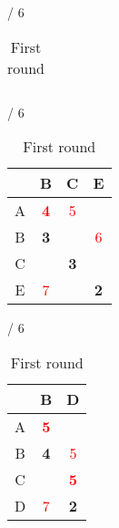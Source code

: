 \documentclass[a4paper, 11 pt, article, accentcolor=tud7b]{tudreport}
\begin{document}
\begin{table}[h]
\begin{subtable}[b]{\textwidth / 6}
\begin{tabular}{| c | c | c |}
	    \end{tabular}
	    \caption{$D^{C}$}
	  \end{subtable}
    \hfill
	  \begin{subtable}[b]{\textwidth / 6}
	    \begin{tabular}{| c | c | c | c |}
	    \hline
	      & B                   & C           & E                   \\ \hline
	    A & \textbf{\textcolor{red}{4}} & \textcolor{red}{5} &      \\ \hline
	    B & \textbf{3}          &             & \textcolor{red}{6}  \\ \hline
	    C &                     & \textbf{3}  &                     \\ \hline
	    E & \textcolor{red}{7}  &             & \textbf{2}          \\ \hline
	    \end{tabular}
	    \caption{$D^{D}$}
	  \end{subtable}
	  \hfill
	  \begin{subtable}[b]{\textwidth / 6}
	    \begin{tabular}{| c | c | c |}
	    \hline
	      & B                   & D                            \\ \hline
	    A & \textbf{\textcolor{red}{5}} &                      \\ \hline
	    B & \textbf{4}          & \textcolor{red}{5}           \\ \hline
	    C &                     & \textbf{\textcolor{red}{5}}  \\ \hline
	    D & \textcolor{red}{7}  & \textbf{2}                   \\ \hline
	    \end{tabular}
	    \caption{$D^{E}$}
	  \end{subtable}
	  \caption{First round}
	\end{table}
	
\end{document}
